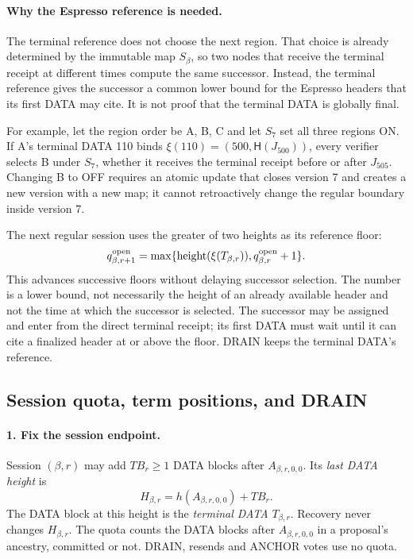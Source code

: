 \documentclass[11pt,a4paper]{article}
\newcommand{\Hash}{\mathsf H}
\newcommand{\TB}{\mathit{TB}}
\newcommand{\defterm}[1]{\textcolor{rrBlue}{\textit{#1}}}
\begin{document}
\paragraph{Why the Espresso reference is needed.}
The terminal reference does not choose the next region. That choice is
already determined by the immutable map $S_\beta$, so two nodes that
receive the terminal receipt at different times compute the same
successor. Instead, the terminal reference gives the successor a common
lower bound for the Espresso headers that its first DATA may cite. It is
not proof that the terminal DATA is globally final.

For example, let the region order be A, B, C and let $S_7$ set all three
regions ON. If A's terminal DATA 110 binds
$\xi(110)=(500,\Hash(J_{500}))$, every verifier selects B under $S_7$,
whether it receives the terminal receipt before or after $J_{505}$.
Changing B to OFF requires an atomic update that closes version 7 and
creates a new version with a new map; it cannot retroactively change the
regular boundary inside version 7.

The next regular session uses the greater of two heights as its reference
floor:
\[
 q^{\rm open}_{\beta,r+1}
 =\max\{\operatorname{height}(\xi(T_{\beta,r})),
         q^{\rm open}_{\beta,r}+1\}.
\]
This advances successive floors without delaying successor selection.
The number is a lower bound, not necessarily the height of an already
available header and not the time at which the successor is selected.
The successor may be assigned and enter from the direct terminal receipt;
its first DATA must wait until it can cite a finalized header at or above
the floor. DRAIN keeps the terminal DATA's reference.

\subsection{Session quota, term positions, and DRAIN}
\label{sec:quota}
\paragraph{1. Fix the session endpoint.}
Session $(\beta,r)$ may add $\TB_r\ge1$ DATA blocks after
$A_{\beta,r,0,0}$. Its \defterm{last DATA height} is
\[
 H_{\beta,r}=h(A_{\beta,r,0,0})+\TB_r.
\]
The DATA block at this height is the \defterm{terminal DATA}
$T_{\beta,r}$. Recovery never changes $H_{\beta,r}$. The quota counts the
DATA blocks after $A_{\beta,r,0,0}$ in a proposal's ancestry, committed
or not. DRAIN, resends and ANCHOR votes use no quota.
\end{document}
